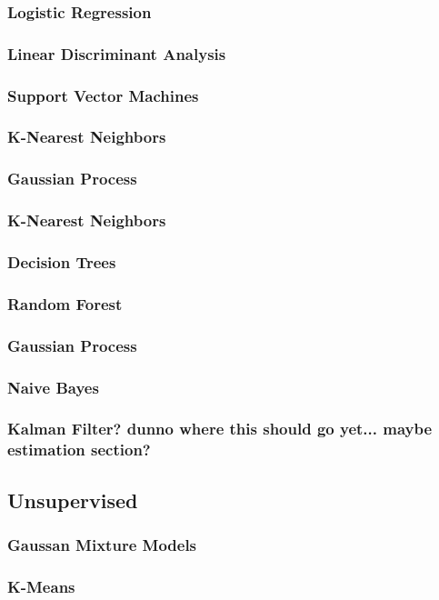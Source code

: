 \documentclass[11pt]{article}
\begin{document}
\subsubsection{Logistic Regression}
\subsubsection{Linear Discriminant Analysis}
\subsubsection{Support Vector Machines}
\subsubsection{K-Nearest Neighbors}
\subsubsection{Gaussian Process}
\subsubsection{K-Nearest Neighbors}
\subsubsection{Decision Trees}
\subsubsection{Random Forest}
\subsubsection{Gaussian Process}
\subsubsection{Naive Bayes}
\subsubsection{Kalman Filter? dunno where this should go yet... maybe estimation section?}
\subsection{Unsupervised}
\subsubsection{Gaussan Mixture Models}
\subsubsection{K-Means}
\end{document}
